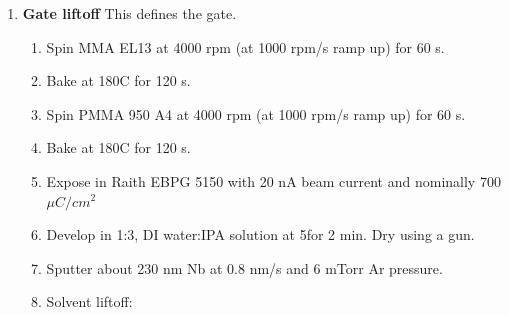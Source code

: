 \begin{enumerate}
\begin{enumerate}
        \item Atomic layer deposition in Savannah S100 Atomic Layer Deposition Cambridge Nanotech.
        \begin{enumerate}
            \item Flow  at 20 sscm. Chamber temp is set to 120$\degree$C.
            \item Repeat the following for 300 cycles:
            \begin{enumerate}
                \item Pulse water valve for 0.1 s
                \item Wait 40 s.
                \item Pulse Hf precursor for 0.3 s.
                \item Wait 40 s.
            \end{enumerate}
        \end{enumerate}
        \item Solvent liftoff
        \begin{enumerate}
            \item Soak in NMP for 120 mins at 80\degree C.
            \item Sonnicate for 1 min in NMP.
            \item Soak in Acetone for 1 min.
            \item Soak in IPA for 1 min.
            \item Dry using  gun
        \end{enumerate}
    \end{enumerate}
    \item \textbf{Gate liftoff} This defines the gate.
    \begin{enumerate}
        \item Spin MMA EL13 at 4000 rpm (at 1000 rpm/s ramp up) for 60 s.
        \item Bake at 180\degree C for 120 s.
        \item Spin PMMA 950 A4 at 4000 rpm (at 1000 rpm/s ramp up) for 60 s.
        \item Bake at 180\degree C for 120 s.
        \item Expose in Raith EBPG 5150 with 20 nA beam current and nominally 700 $\mu C/cm^2 $
        \item Develop in  1:3, DI water:IPA solution at 5\degree for 2 min. Dry using a  gun.
        \item Sputter about 230 nm Nb at 0.8 nm/s and 6 mTorr Ar pressure.
        \item Solvent liftoff:

\end{enumerate}
\end{enumerate}
